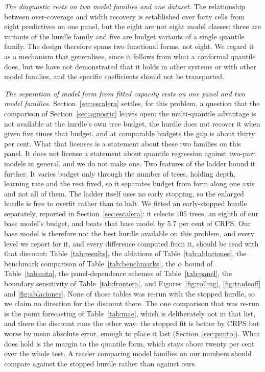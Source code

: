\documentclass[preprint,3p,times]{elsarticle}
\begin{document}
\emph{The diagnostic rests on two model families and one dataset.} The relationship between over-coverage and width recovery is established over forty cells from eight predictives on one panel, but the eight are not eight model classes: three are variants of the hurdle family and five are budget variants of a single quantile family. The design therefore spans two functional forms, not eight. We regard it as a mechanism that generalises, since it follows from what a conformal quantile does, but we have not demonstrated that it holds in other systems or with other model families, and the specific coefficients should not be transported.

\emph{The separation of model form from fitted capacity rests on one panel and two model families.} Section~\ref{sec:escalera} settles, for this problem, a question that the comparison of Section~\ref{sec:agnostic} leaves open: the multi-quantile advantage is not available at the hurdle's own tree budget, the hurdle does not recover it when given five times that budget, and at comparable budgets the gap is about thirty per cent. What that licenses is a statement about these two families on this panel. It does not license a statement about quantile regression against two-part models in general, and we do not make one. Two features of the ladder bound it further. It varies budget only through the number of trees, holding depth, learning rate and the rest fixed, so it separates budget from form along one axis and not all of them. The ladder itself uses no early stopping, so the enlarged hurdle is free to overfit rather than to halt. We fitted an early-stopped hurdle separately, reported in Section~\ref{sec:escalera}: it selects 105 trees, an eighth of our base model's budget, and beats that base model by 5.7 per cent of CRPS. Our base model is therefore not the best hurdle available on this problem, and every level we report for it, and every difference computed from it, should be read with that discount: Table~\ref{tab:results}, the ablations of Table~\ref{tab:ablaciones}, the benchmark comparison of Table~\ref{tab:benchmarks}, the $\alpha$ bound of Table~\ref{tab:cota}, the panel-dependence schemes of Table~\ref{tab:panel}, the boundary sensitivity of Table~\ref{tab:frontera}, and Figures~\ref{fig:rolling}, \ref{fig:tradeoff} and \ref{fig:ablaciones}. None of those tables was re-run with the stopped hurdle, so we claim no direction for the discount there. The one comparison that was re-run is the point forecasting of Table~\ref{tab:mae}, which is deliberately not in that list, and there the discount runs the other way: the stopped fit is better by CRPS but worse by mean absolute error, enough to place it last (Section~\ref{sec:punto}). What does hold is the margin to the quantile form, which stays above twenty per cent over the whole test. A reader comparing model families on our numbers should compare against the stopped hurdle rather than against ours.
\end{document}

